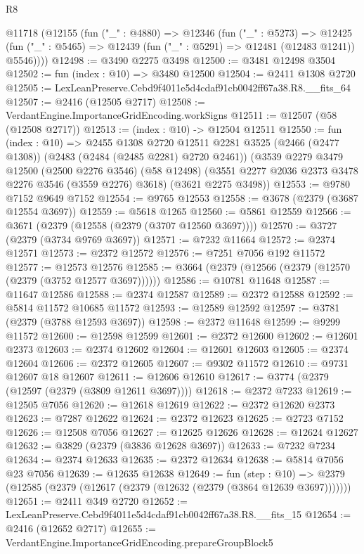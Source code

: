 \begin{lexlean}{R8}
\begin{coremodule}
  @11718
    (@12155
      (fun ("_" : @4880) =>
      @12346
        (fun ("_" : @5273) =>
        @12425 (fun ("_" : @5465) => @12439 (fun ("_" : @5291) => @12481 (@12483 @1241)) @5546))))
@12498 := @3490 @2275 @3498
@12500 := @3481 @12498 @3504
@12502 := fun (index : @10) => @3480 @12500
@12504 := @2411 @1308 @2720
@12505 := LexLeanPreserve.Cebd9f4011e5d4cdaf91cb0042ff67a38.R8.__fits_64
@12507 := @2416 (@12505 @2717)
@12508 := VerdantEngine.ImportanceGridEncoding.workSigns
@12511 := @12507 (@58 (@12508 @2717))
@12513 := (index : @10) -> @12504 @12511
@12550 := fun (index : @10) =>
  @2455
    @1308
    @2720
    @12511
    @2281
    @3525
    (@2466 (@2477 @1308))
    (@2483 (@2484 (@2485 @2281) @2720 @2461))
    (@3539
      @2279
      @3479
      @12500
      (@2500 @2276 @3546)
      (@58 @12498)
      (@3551 @2277 @2036 @2373 @3478 @2276 @3546 (@3559 @2276) @3618)
      (@3621 @2275 @3498))
@12553 := @9780 @7152 @9649 @7152
@12554 := @9765 @12553
@12558 := @3678 (@2379 (@3687 @12554 @3697))
@12559 := @5618 @1265
@12560 := @5861 @12559
@12566 := @3671 (@2379 (@12558 (@2379 (@3707 @12560 @3697))))
@12570 := @3727 (@2379 (@3734 @9769 @3697))
@12571 := @7232 @11664
@12572 := @2374 @12571
@12573 := @2372 @12572
@12576 := @7251 @7056 @192 @11572
@12577 := @12573 @12576
@12585 := @3664 (@2379 (@12566 (@2379 (@12570 (@2379 (@3752 @12577 @3697))))))
@12586 := @10781 @11648
@12587 := @11647 @12586
@12588 := @2374 @12587
@12589 := @2372 @12588
@12592 := @5814 @11572 @10685 @11572
@12593 := @12589 @12592
@12597 := @3781 (@2379 (@3788 @12593 @3697))
@12598 := @2372 @11648
@12599 := @9299 @11572
@12600 := @12598 @12599
@12601 := @2372 @12600
@12602 := @12601 @2373
@12603 := @2374 @12602
@12604 := @12601 @12603
@12605 := @2374 @12604
@12606 := @2372 @12605
@12607 := @9302 @11572
@12610 := @9731 @12607 @18 @12607
@12611 := @12606 @12610
@12617 := @3774 (@2379 (@12597 (@2379 (@3809 @12611 @3697))))
@12618 := @2372 @7233
@12619 := @12505 @7056
@12620 := @12618 @12619
@12622 := @2372 @12620 @2373
@12623 := @7287 @12622
@12624 := @2372 @12623
@12625 := @2723 @7152
@12626 := @12508 @7056
@12627 := @12625 @12626
@12628 := @12624 @12627
@12632 := @3829 (@2379 (@3836 @12628 @3697))
@12633 := @7232 @7234
@12634 := @2374 @12633
@12635 := @2372 @12634
@12638 := @5814 @7056 @23 @7056
@12639 := @12635 @12638
@12649 := fun (step : @10) =>
  @2379 (@12585 (@2379 (@12617 (@2379 (@12632 (@2379 (@3864 @12639 @3697)))))))
@12651 := @2411 @349 @2720
@12652 := LexLeanPreserve.Cebd9f4011e5d4cdaf91cb0042ff67a38.R8.__fits_15
@12654 := @2416 (@12652 @2717)
@12655 := VerdantEngine.ImportanceGridEncoding.prepareGroupBlock5

\end{coremodule}
\end{lexlean}
